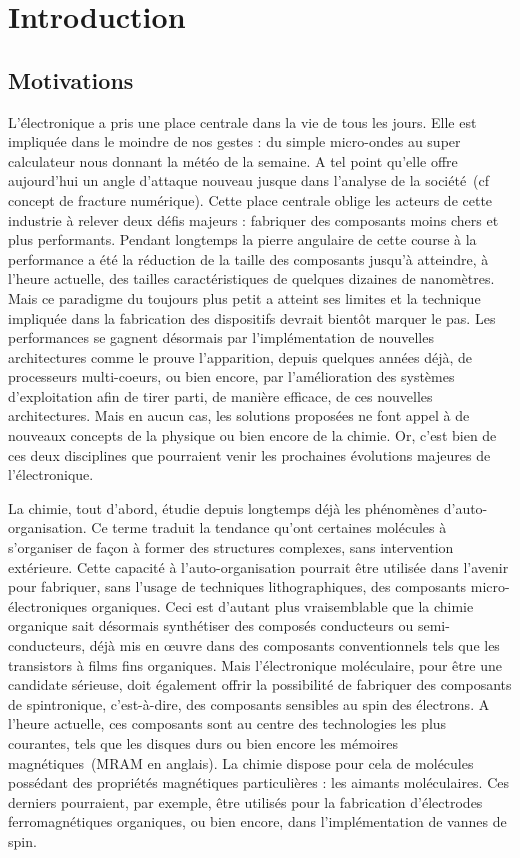 \chapter*{Introduction}
\setcounter{figure}{0}

\section*{Motivations}
L'électronique a pris une place centrale dans la vie de tous les jours. Elle est impliquée dans le moindre de nos gestes : du simple micro-ondes au super calculateur nous donnant la météo de la semaine. A tel point qu'elle offre aujourd'hui un angle d'attaque nouveau jusque dans l'analyse de la société~(cf concept de fracture numérique). Cette place centrale oblige les acteurs de cette industrie à relever deux défis majeurs : fabriquer des composants moins chers et plus performants. Pendant longtemps la pierre angulaire de cette course à la performance a été la réduction de la taille des composants jusqu'à atteindre, à l'heure actuelle, des tailles caractéristiques de quelques dizaines de nanomètres. Mais ce paradigme du toujours plus petit a atteint ses limites et la technique impliquée dans la fabrication des dispositifs devrait bientôt marquer le pas. Les performances se gagnent désormais par l'implémentation de nouvelles architectures comme le prouve l'apparition, depuis quelques années déjà, de processeurs multi-coeurs, ou bien encore, par l'amélioration des systèmes d'exploitation afin de tirer parti, de manière efficace, de ces nouvelles architectures. Mais en aucun cas, les solutions proposées ne font appel à de nouveaux concepts de la physique ou bien encore de la chimie. Or, c'est bien de ces deux disciplines que pourraient venir les prochaines évolutions majeures de l'électronique.

La chimie, tout d'abord, étudie depuis longtemps déjà les phénomènes d'auto-organisation. Ce terme traduit la tendance qu'ont certaines molécules à s'organiser de façon à former des structures complexes, sans intervention extérieure. Cette capacité à l'auto-organisation pourrait être utilisée dans l'avenir pour fabriquer, sans l'usage de techniques lithographiques, des composants micro-électroniques organiques. Ceci est d'autant plus vraisemblable que la chimie organique sait désormais synthétiser des composés conducteurs ou semi-conducteurs, déjà mis en œuvre dans des composants conventionnels tels que les transistors à films fins organiques. Mais l'électronique moléculaire, pour être une candidate sérieuse, doit également offrir la possibilité de fabriquer des composants de spintronique, c'est-à-dire, des composants sensibles au spin des électrons. A l'heure actuelle, ces composants sont au centre des technologies les plus courantes, tels que les disques durs ou bien encore les mémoires magnétiques~(MRAM en anglais). La chimie dispose pour cela de molécules possédant des propriétés magnétiques particulières : les aimants moléculaires. Ces derniers pourraient, par exemple, \^etre utilisés pour la fabrication d'électrodes ferromagnétiques organiques, ou bien encore, dans l'implémentation de vannes de spin.

